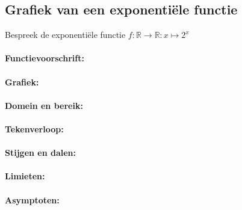 \documentclass[12pt,twoside]{article}
\begin{document}
\subsection{Grafiek van een exponentiële functie}

\begin{oefening}
Bespreek de exponentiële functie $f:\mathbb{R}\to\mathbb{R}: x\mapsto 2^x$
\paragraph*{Functievoorschrift:}
\begin{center}
\visgraad{12cm}
\end{center}
\paragraph*{Grafiek:}
\begin{center}
\vspace*{-0.5cm}
\end{center}
\paragraph*{Domein en bereik:} \arulefill
\paragraph*{Tekenverloop:}
\begin{center}
\vspace*{-0.5cm}
\visgraad{5cm}
\end{center}
\paragraph*{Stijgen en dalen:}
\begin{center}
\vspace*{-0.5cm}
\visgraad{5cm}
\end{center}
\paragraph*{Limieten:} \arulefill
\paragraph*{Asymptoten:} \arulefill
\end{oefening}
\end{document}
